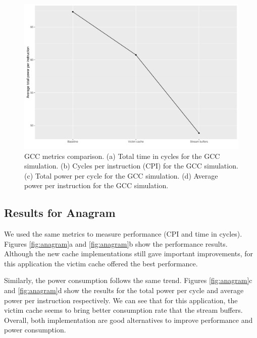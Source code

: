 \documentclass[10pt]{scrartcl}
\begin{document}
\begin{figure}
\endminipage
{}%
  \includegraphics[width=\linewidth]{./Plots/gcc_4.pdf}
\endminipage
\caption{GCC metrics comparison. (a) Total time in cycles for the GCC simulation. (b) Cycles per instruction (CPI) for the GCC simulation. (c) Total power per cycle for the GCC simulation. (d) Average power per instruction for the GCC simulation.}\label{fig:gcc}
\end{figure}

\FloatBarrier
\subsection{Results for Anagram}
We used the same metrics to measure performance (CPI and time in cycles).  Figures \ref{fig:anagram}a and \ref{fig:anagram}b show the performance results.  Although the new cache implementations still gave important improvements, for this application the victim cache offered the best performance.

Similarly, the power consumption follows the same trend.  Figures \ref{fig:anagram}c and \ref{fig:anagram}d show the results for the total power per cycle and average power per instruction respectively.  We can see that for this application, the victim cache seems to bring better consumption rate that the stream buffers.  Overall, both implementation are good alternatives to improve performance and power consumption.
\end{document}
